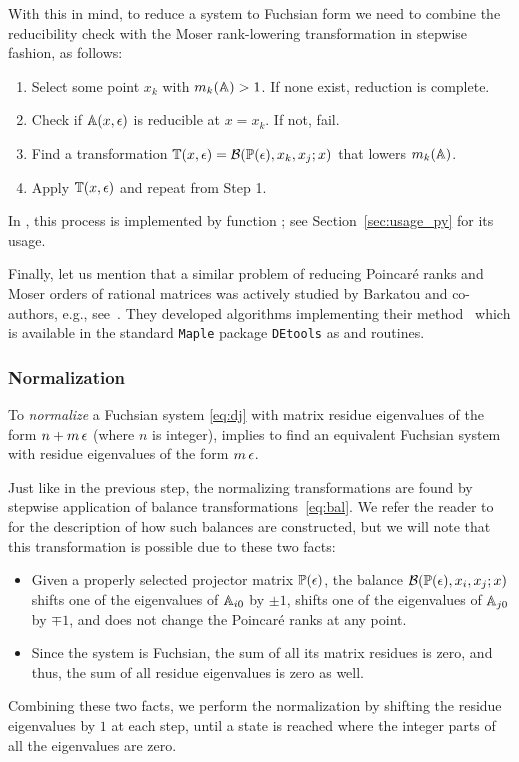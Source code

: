 \documentclass[12pt,a4paper]{article}
\begin{document}
With this in mind, to reduce a system to Fuchsian form we need to combine the reducibility check with the Moser rank-lowering transformation in stepwise fashion, as follows:

\begin{enumerate}
    \item Select some point $x_k$ with $m_k(\mathbb{A}) > 1$. If none exist, reduction is complete.
    \item Check if $\mathbb{A}(x,\epsilon)$ is reducible at $x=x_k$. If not, fail.
    \item Find a transformation $\mathbb{T}(x,\epsilon) = \mathcal{B}(\mathbb{P}(\epsilon), x_k, x_j; x)$ that lowers $m_k(\mathbb{A})$.
    \item Apply $\mathbb{T}(x,\epsilon)$ and repeat from Step 1.
\end{enumerate}

In \fuchsia, this process is implemented by function ; see Section~\ref{sec:usage_py} for its usage.

Finally, let us mention that a similar problem of reducing Poincar\'e ranks and Moser orders of rational matrices was actively studied by Barkatou and co-authors, e.g., see~\cite{BP99}.
They developed algorithms implementing their method~\cite{BP99} which is available in the standard \texttt{Maple} package \texttt{DEtools} as  and  routines.


\subsubsection{Normalization}
\label{sec:norm}

To \textit{normalize} a Fuchsian system \eqref{eq:dj} with matrix residue eigenvalues of the form $n+m\,\epsilon$ (where $n$ is integer), implies to find an equivalent Fuchsian system with residue eigenvalues of the form $m\,\epsilon$.

Just like in the previous step, the normalizing transformations are found by stepwise application of balance transformations~\eqref{eq:bal}.
We refer the reader to~\cite[p.~11]{Lee15} for the description of how such balances are constructed, but we will note that this transformation is possible due to these two facts:
\begin{itemize}
    \item Given a properly selected projector matrix $\mathbb{P}(\epsilon)$, the balance $\mathcal{B}(\mathbb{P}(\epsilon), x_i, x_j; x)$ shifts one of the eigenvalues of $\mathbb{A}_{i0}$ by $\pm1$, shifts one of the eigenvalues of $\mathbb{A}_{j0}$ by $\mp1$, and does not change the Poincar\'e ranks at any point.
    \item Since the system is Fuchsian, the sum of all its matrix residues is zero, and thus, the sum of all residue eigenvalues is zero as well.
\end{itemize}
Combining these two facts, we perform the normalization by shifting the residue eigenvalues by $1$ at each step, until a state is reached where the integer parts of all the eigenvalues are zero.
\end{document}

